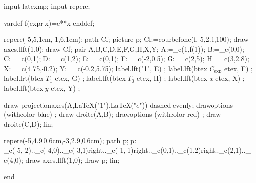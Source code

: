 input latexmp;
input repere;

vardef f(expr x)=e**x enddef;

repere(-5,5,1cm,-1,6,1cm);
 path Cf; picture p;
 Cf:=courbefonc(f,-5,2.1,100);
 draw axes.llft(1,0);
 draw Cf;
 pair A,B,C,D,E,F,G,H,X,Y;
 A:=_c(1,f(1));
 B:=_c(0,0);
 C:=_c(0,1);
 D:=_c(1,2);
 E:=_c(0,1);
 F:=_c(-2,0.5);
 G:=_c(2,5);
 H:=_c(3,2.8);
 X:=_c(4.75,-0.2);
 Y:=_c(-0.2,5.75);
 label.lft("1", E) ;
 label.lft(btex $ C_{\exp} $ etex, F) ;
  label.lrt(btex $ T_1 $ etex, G) ;
    label.lft(btex $ T_0 $ etex, H) ;
    label.lft(btex $x$ etex, X) ;
    label.lft(btex $y$ etex, Y) ;


 draw projectionaxes(A,LaTeX("$1$"),LaTeX("$e$")) dashed evenly;
 drawoptions (withcolor blue) ;
  draw droite(A,B);
drawoptions (withcolor red) ;
 draw droite(C,D); 
fin;



repere(-5,4.9,0.6cm,-3,2.9,0.6cm);
 path p;
 p:= _c(-5,-2).._c(-4,0).._c(-3,1){right}.._c(-1,-1){right}.._c(0,1).._c(1,2){right}.._c(2,1).._c(4,0);
 draw axes.llft(1,0);
 draw p;
fin;

end
